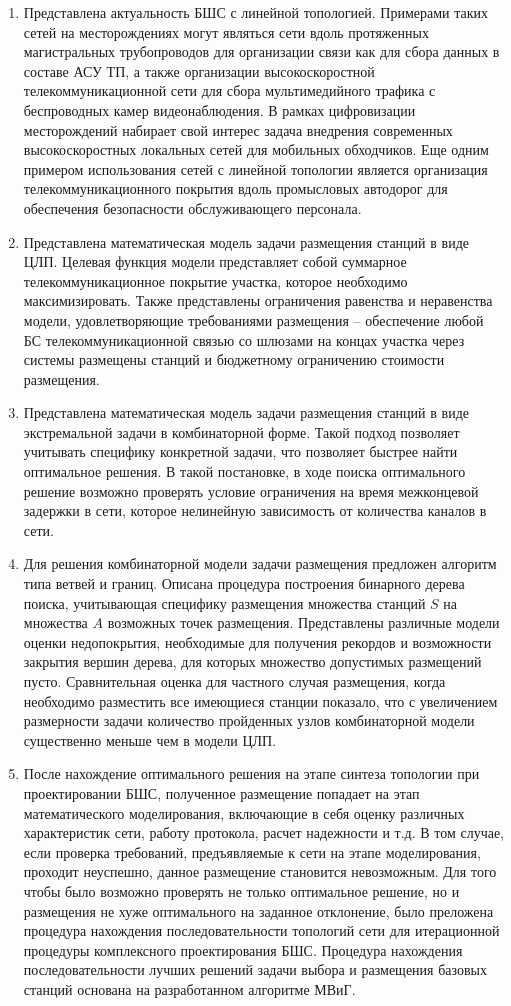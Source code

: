 \begin{enumerate}
  \item Представлена актуальность БШС с линейной топологией. Примерами таких сетей на месторождениях могут являться сети вдоль протяженных магистральных трубопроводов для организации связи как для сбора данных в составе АСУ ТП, а также организации высокоскоростной телекоммуникационной сети для сбора мультимедийного трафика с беспроводных камер видеонаблюдения. В рамках цифровизации месторождений набирает свой интерес задача внедрения современных высокоскоростных локальных сетей для мобильных обходчиков. Еще одним примером использования сетей с линейной топологии является организация телекоммуникационного покрытия вдоль промысловых автодорог для обеспечения безопасности обслуживающего персонала. 
  \item Представлена математическая модель задачи размещения станций в виде ЦЛП. Целевая функция модели представляет собой  суммарное телекоммуникационное покрытие участка, которое необходимо максимизировать. Также представлены ограничения равенства и неравенства модели, удовлетворяющие требованиями размещения -- обеспечение любой БС телекоммуникационной связью со шлюзами на концах участка через системы размещены станций и бюджетному ограничению стоимости размещения.
  \item Представлена математическая модель задачи размещения станций в виде экстремальной задачи в комбинаторной форме. Такой подход позволяет учитывать специфику конкретной задачи, что позволяет быстрее найти оптимальное решения. В такой постановке, в ходе поиска оптимального решение возможно проверять условие ограничения на время межконцевой задержки в сети, которое нелинейную зависимость от количества каналов в сети.
  \item Для решения комбинаторной модели задачи размещения предложен алгоритм типа ветвей и границ. Описана процедура построения бинарного дерева поиска, учитывающая специфику размещения множества станций $S$ на множества $A$ возможных точек размещения. Представлены различные модели оценки недопокрытия, необходимые для получения рекордов и возможности закрытия вершин дерева, для которых множество допустимых размещений пусто. Сравнительная оценка для частного случая размещения, когда необходимо разместить все имеющиеся станции показало, что с увеличением размерности задачи количество пройденных узлов комбинаторной модели существенно меньше чем в модели ЦЛП. 
  \item После нахождение оптимального решения на этапе синтеза топологии при проектировании БШС, полученное размещение попадает на этап математического моделирования, включающие в себя оценку различных характеристик сети, работу протокола, расчет надежности и т.д. В том случае, если проверка требований, предъявляемые к сети на этапе моделирования, проходит неуспешно, данное размещение становится невозможным. Для того чтобы  было возможно проверять не только оптимальное решение, но и размещения не хуже оптимального на заданное отклонение, было преложена процедура нахождения последовательности топологий сети для итерационной процедуры комплексного проектирования БШС. Процедура нахождения последовательности лучших решений задачи выбора и размещения базовых станций основана на разработанном алгоритме МВиГ.
  

\end{enumerate}

